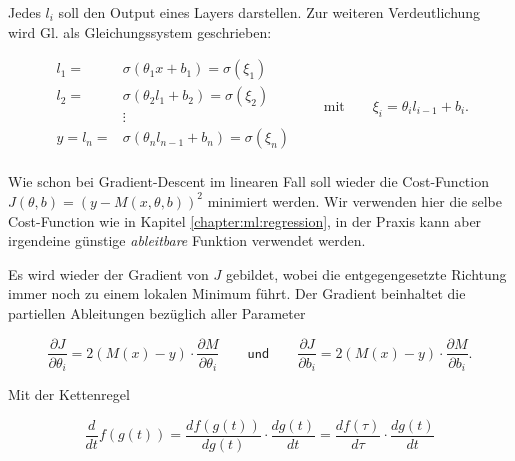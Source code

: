 Jedes $l_i$ soll den Output eines Layers darstellen. Zur weiteren Verdeutlichung wird
Gl.  als Gleichungssystem geschrieben:

\begin{equation}
    \begin{aligned}
        l_1 = &\sigma(\theta_1 x + b_1) = \sigma(\xi_1)\\
        l_2 = &\sigma(\theta_2 l_1 + b_2) = \sigma(\xi_2)\\
        &\vdots\\
        y=l_n = &\sigma(\theta_n l_{n-1} + b_n) = \sigma(\xi_n)\\
    \end{aligned}
    \qquad\text{mit}\qquad
    \xi_i = \theta_i l_{i-1} + b_i
    .
\end{equation}

Wie schon bei Gradient-Descent im linearen Fall soll wieder die Cost-Function $J(\theta,b)
= (y - M(x, \theta, b))^2$ minimiert werden. Wir verwenden hier die selbe Cost-Function
wie in Kapitel \ref{chapter:ml:regression}, in der Praxis kann aber irgendeine günstige
\emph{ableitbare} Funktion verwendet werden.

Es wird wieder der Gradient von $J$ gebildet, wobei die entgegengesetzte Richtung immer
noch zu einem lokalen Minimum führt. Der Gradient beinhaltet die partiellen Ableitungen
bezüglich aller Parameter

\begin{equation}
    \frac{\partial J}{\partial \theta_i} = 2(M(x) - y) \cdot \frac{\partial M}{\partial \theta_i}
    \qquad\textsf{und}\qquad
    \frac{\partial J}{\partial b_i} = 2(M(x) - y) \cdot \frac{\partial M}{\partial b_i}.
\end{equation}

Mit der Kettenregel

\begin{equation}
    \frac{d}{dt}f(g(t)) = \frac{df(g(t))}{d g(t)} \cdot \frac{d g(t)}{dt} = \frac{df(\tau)}{d \tau} \cdot \frac{d g(t)}{dt}
\end{equation}

